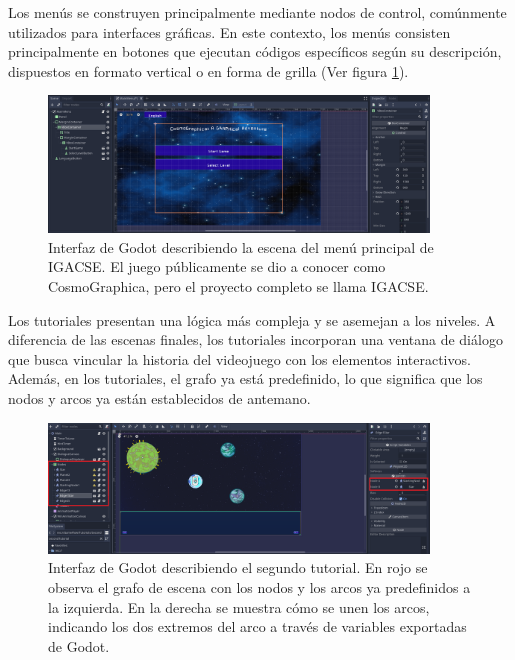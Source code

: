 Los menús se construyen principalmente mediante nodos de control, comúnmente utilizados para interfaces gráficas. En este contexto, los menús consisten principalmente en botones que ejecutan códigos específicos según su descripción, dispuestos en formato vertical o en forma de grilla (Ver figura \ref{GodotMenuInterface}).

\begin{figure}[h]
	\centering
	\includegraphics[width=0.9\textwidth]{imagenes/GodotInterfaceMainMenu.png}
	\caption{Interfaz de Godot describiendo la escena del menú principal de IGACSE. El juego públicamente se dio a conocer como CosmoGraphica, pero el proyecto completo se llama IGACSE.}
	\label{GodotMenuInterface}
\end{figure}


Los tutoriales presentan una lógica más compleja y se asemejan a los niveles. A diferencia de las escenas finales, los tutoriales incorporan una ventana de diálogo que busca vincular la historia del videojuego con los elementos interactivos. Además, en los tutoriales, el grafo ya está predefinido, lo que significa que los nodos y arcos ya están establecidos de antemano.

\begin{figure}[h]
	\centering
	\includegraphics[width=0.9\textwidth]{imagenes/SecondTutorialGraph.png}
	\caption{Interfaz de Godot describiendo el segundo tutorial. En rojo se observa el grafo de escena con los nodos y los arcos ya predefinidos a la izquierda. En la derecha se muestra cómo se unen los arcos, indicando los dos extremos del arco a través de variables exportadas de Godot.}
	\label{SecondTutorialGraph}
\end{figure}


